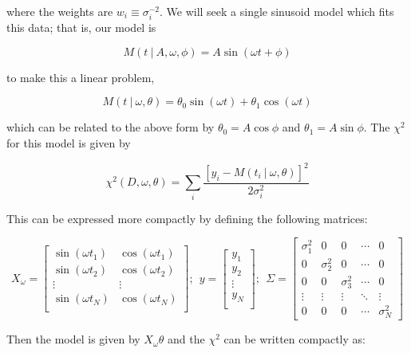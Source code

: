 \documentclass[12pt,preprint]{aastex}
\begin{document}
where the weights are $w_i \equiv \sigma_i^{-2}$. We will seek a single sinusoid model which fits this data; that is, our model is

\begin{equation}
M(t~|~A,\omega,\phi) = A \sin(\omega t + \phi)
\end{equation}

to make this a linear problem,

\begin{equation}
M(t~|~\omega,\theta) = \theta_0 \sin(\omega t) + \theta_1\cos(\omega t)
\end{equation}

which can be related to the above form by $\theta_0 = A\cos\phi$ and $\theta_1 = A\sin\phi$.
The $\chi^2$ for this model is given by

\begin{equation}
\chi^2(D, \omega, \theta) = \sum_i\frac{[y_i - M(t_i~|~\omega,\theta)]^2}{2\sigma_i^2}
\end{equation}

This can be expressed more compactly by defining the following matrices:

\begin{equation}
X_\omega = \left[
\begin{array}{cc}
\sin(\omega t_1) & \cos(\omega t_1)\\
\sin(\omega t_2) & \cos(\omega t_2)\\
\vdots & \vdots \\
\sin(\omega t_N) & \cos(\omega t_N)\\
\end{array}
\right];~~
y = \left[
\begin{array}{c}
y_1 \\
y_2\\
\vdots \\
y_N\\
\end{array}
\right];~~
\Sigma = \left[
\begin{array}{ccccc}
\sigma_1^2 & 0 & 0 & \cdots & 0\\
0 & \sigma_2^2 & 0 & \cdots & 0\\
0 & 0 & \sigma_3^2 & \cdots & 0\\
\vdots & \vdots & \vdots & \ddots & \vdots\\
0 & 0 & 0 & \cdots & \sigma_N^2
\end{array}
\right]
\end{equation}

Then the model is given by $X_\omega\theta$ and the $\chi^2$ can be written
compactly as:
\end{document}
